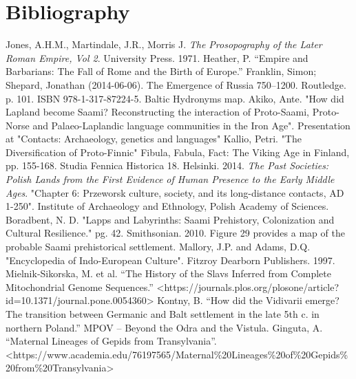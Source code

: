 \documentclass{article}
\begin{document}
	\newpage
	
	\section{Bibliography}
	\label{sec:Bibliography}
	
	\begin{thebibliography}{99}
		Jones, A.H.M., Martindale, J.R., Morris J. \textit{The Prosopography of the Later Roman Empire, Vol 2}. University Press. 1971.
		Heather, P. “Empire and Barbarians: The Fall of Rome and the Birth of Europe.”
		Franklin, Simon; Shepard, Jonathan (2014-06-06). The Emergence of Russia 750–1200. Routledge. p. 101. ISBN 978-1-317-87224-5.
		Baltic Hydronyms map.
		Akiko, Ante. "How did Lapland become Saami? Reconstructing the interaction of Proto-Saami, Proto-Norse and Palaeo-Laplandic language communities in the Iron Age". Presentation at "Contacts: Archaeology, genetics and languages"
		Kallio, Petri. "The Diversification of Proto-Finnic" Fibula, Fabula, Fact: The Viking Age in Finland, pp. 155-168. Studia Fennica Historica 18. Helsinki. 2014.
		\textit{The Past Societies: Polish Lands from the First Evidence of Human Presence to the Early Middle Ages}. "Chapter 6: Przeworsk culture, society, and its long-distance contacts, AD 1-250". Institute of Archaeology and Ethnology, Polish Academy of Sciences.
		Boradbent, N. D. "Lapps and Labyrinths:  Saami Prehistory, Colonization and Cultural Resilience." pg. 42. Smithsonian. 2010. \tiny Figure 29 provides a map of the probable Saami prehistorical settlement.
		\normalsize
		Mallory, J.P. and Adams, D.Q. "Encyclopedia of Indo-European Culture". Fitzroy Dearborn Publishers. 1997.
		Mielnik-Sikorska, M. et al. “The History of the Slavs Inferred from Complete Mitochondrial Genome Sequences.” <https://journals.plos.org/plosone/article?id=10.1371/journal.pone.0054360>
		Kontny, B. “How did the Vidivarii emerge? The transition between Germanic and Balt settlement in the late 5th c. in northern Poland.” MPOV – Beyond the Odra and the Vistula.
		Ginguta, A. “Maternal Lineages of Gepids from Transylvania”. <https://www.academia.edu/76197565/Maternal\%20Lineages\%20of\%20Gepids\%20from\%20Transylvania>

\end{thebibliography}
\end{document}
